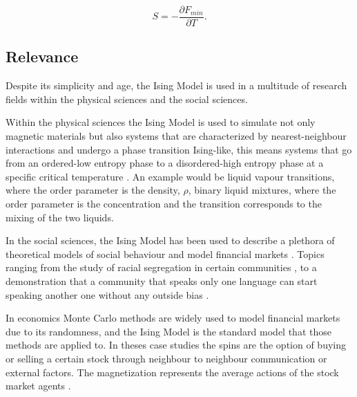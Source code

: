 \begin{equation}
	S = - \frac{\partial F_{min}}{\partial T}.
\end{equation}

\subsection{Relevance}

Despite its simplicity and age, the Ising Model is used in a multitude of research fields within the physical sciences and the social sciences. 

Within the physical sciences the Ising Model is used to simulate not only magnetic materials but also systems that are characterized by nearest-neighbour interactions and undergo a phase transition Ising-like, this means systems that go from an ordered-low entropy phase to a disordered-high entropy phase at a specific critical temperature \cite{Pelissetto2002}. 
An example would be liquid vapour transitions, where the order parameter is the density, $\rho$, binary liquid mixtures, where the order parameter is the concentration and the transition corresponds to the mixing of the two liquids.

In the social sciences, the Ising Model has been used to describe a plethora of theoretical models of social behaviour and model financial markets \cite{review_social_ising}. 
Topics ranging from the study of racial segregation in certain communities \cite{segregation}, to a demonstration that a community that speaks only one language can start speaking another one without any outside bias \cite{language_ising}.

In economics Monte Carlo methods are widely used to model financial markets due to its randomness, and the Ising Model is the standard model that those methods are applied to. In theses case studies the spins are the option of buying or selling a certain stock through neighbour to neighbour communication or external factors. The magnetization represents the average actions of the stock market agents \cite{stock_ising, eco_thesis}.












